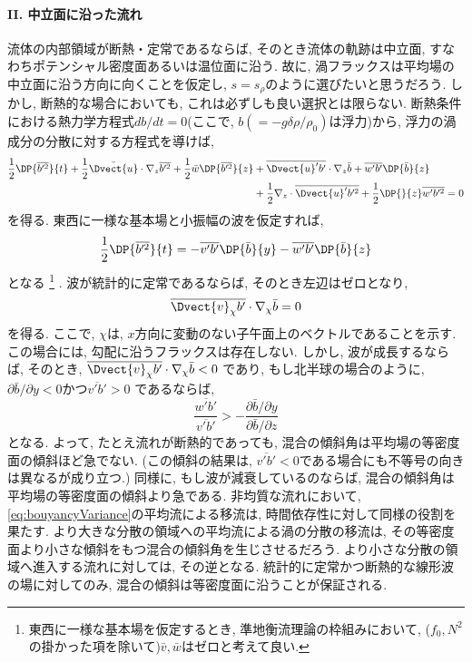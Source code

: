 \paragraph{II. 中立面に沿った流れ}
流体の内部領域が断熱・定常であるならば, そのとき流体の軌跡は中立面, すなわちポテンシャル密度面あるいは温位面に沿う.
故に, 渦フラックスは平均場の中立面に沿う方向に向くことを仮定し, $s=s_\rho$のように選びたいと思うだろう.
しかし, 断熱的な場合においても, これは必ずしも良い選択とは限らない.
断熱条件における熱力学方程式$d b/dt = 0$(ここで, $b(=-g\delta \rho/\rho_0)$は浮力)から, 浮力の渦成分の分散に対する方程式を導けば,
\begin{equation}
 \begin{split}
  \dfrac{1}{2} \DP{\overline{b'^2}}{t} + \dfrac{1}{2} \bar{\Dvect{u}}\cdot\nabla_z \overline{b'^2}
  + \dfrac{1}{2}\bar{w}\DP{\overline{b'^2}}{z} &+ \overline{\Dvect{u}'b'} \cdot \nabla_z \bar{b}
  + \overline{w'b'}\DP{\bar{b}}{z} \\
 &+ \dfrac{1}{2}\nabla_z \cdot \overline{\Dvect{u}'b'^2} + \dfrac{1}{2}\DP{}{z}\overline{w'b'^2}
  = 0
 \end{split}
 \label{eq:bouyancyVariance}
\end{equation}
を得る. 
東西に一様な基本場と小振幅の波を仮定すれば,
\begin{equation}
    \dfrac{1}{2}\DP{\overline{b'^2}}{t}
  = - \overline{v'b'}\DP{\bar{b}}{y} - \overline{w'b'}\DP{\bar{b}}{z} 
\end{equation}
となる%
\footnote{
東西に一様な基本場を仮定するとき, 準地衡流理論の枠組みにおいて,
($f_0, N^2$の掛かった項を除いて)$\bar{v}, \bar{w}$はゼロと考えて良い. 
}%
.
波が統計的に定常であるならば, そのとき左辺はゼロとなり,
\begin{equation}
  \overline{\Dvect{v}_\chi b'} \cdot \nabla_\chi \bar{b} = 0
\end{equation}
を得る.
ここで, $\chi$は, $x$方向に変動のない子午面上のベクトルであることを示す.
この場合には, 勾配に沿うフラックスは存在しない. 
しかし, 波が成長するならば, そのとき, 
$  \overline{\Dvect{v}_\chi b'} \cdot \nabla_\chi \bar{b} < 0$
であり, もし北半球の場合のように,
$\partial \bar{b}/\partial y < 0$かつ$\overline{v'b'}>0$
であるならば,
\begin{equation}
 \dfrac{\overline{w'b'}}{\overline{v'b'}} >
  - \dfrac{\partial\bar{b}/\partial y}{\partial\bar{b}/\partial z} 
\end{equation}
となる.
よって, たとえ流れが断熱的であっても, 混合の傾斜角は平均場の等密度面の傾斜ほど急でない. 
(この傾斜の結果は, $\overline{v'b'}<0$である場合にも不等号の向きは異なるが成り立つ.)
同様に, もし波が減衰しているのならば, 混合の傾斜角は平均場の等密度面の傾斜より急である.
非均質な流れにおいて, \eqref{eq:bouyancyVariance}の平均流による移流は, 時間依存性に対して同様の役割を果たす. 
より大きな分散の領域への平均流による渦の分散の移流は, その等密度面より小さな傾斜をもつ混合の傾斜角を生じさせるだろう.
より小さな分散の領域へ進入する流れに対しては, その逆となる.
統計的に定常かつ断熱的な線形波の場に対してのみ, 混合の傾斜は等密度面に沿うことが保証される.

